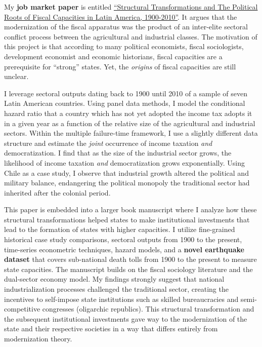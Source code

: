 \documentclass[11pt]{letter} %
\begin{document}
\begin{letter}{}
My {\bf job market paper} is entitled \href{https://github.com/hbahamonde/IncomeTaxAdoption/raw/master/Bahamonde_IncomeTaxAdoption.pdf}{``Structural Transformations and The Political Roots of Fiscal Capacities in Latin America, 1900-2010''}. It argues that the modernization of the fiscal apparatus was the product of an inter-elite sectoral conflict process between the agricultural and industrial classes. The motivation of this project is that according  to many political economists, fiscal sociologists, development economist and economic historians, fiscal capacities are a prerequisite for ``strong'' states. Yet, the \emph{origins} of fiscal capacities are still unclear. 

I leverage sectoral outputs dating back to 1900 until 2010 of a sample of seven Latin American countries. Using panel data methods, I model the conditional hazard ratio that a country which has not yet adopted the income tax adopts it in a given year as a function of the relative size of the agricultural and industrial sectors. Within the multiple failure-time framework, I use a slightly different data structure and estimate the \emph{joint} occurrence of income taxation \emph{and} democratization. I find that as the size of the industrial sector grows, the likelihood of income taxation \emph{and} democratization grows exponentially. Using Chile as a case study, I observe that industrial growth altered the political and military balance, endangering the political monopoly the traditional sector had inherited after the colonial period. 

This paper is embedded into a larger book manuscript where I analyze how these structural transformations helped states to make institutional investments that lead to the formation of states with higher capacities. I utilize fine-grained historical case study comparisons, sectoral outputs from 1900 to the present, time-series econometric techniques, hazard models, and a {\bf novel earthquake dataset} that covers sub-national death tolls from 1900 to the present to measure state capacities. The manuscript builds on the fiscal sociology literature and the dual-sector economy model. My findings strongly suggest that national industrialization processes challenged the traditional sector, creating the incentives to self-impose state institutions such as skilled bureaucracies and semi-competitive congresses (oligarchic republics). This structural transformation and the subsequent institutional investments gave way to the modernization of the state and their respective societies in a way that differs entirely from modernization theory.



\end{letter}
\end{document}
